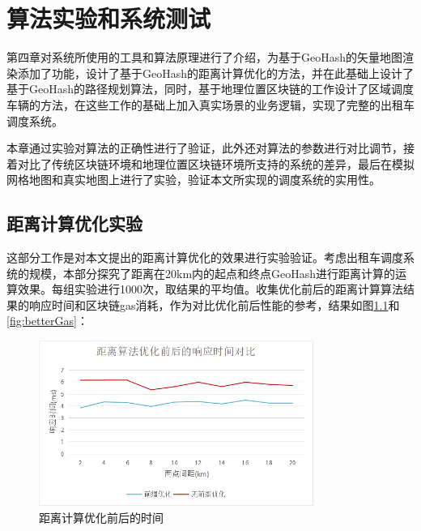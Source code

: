 \chapter{算法实验和系统测试}
第四章对系统所使用的工具和算法原理进行了介绍，为基于GeoHash的矢量地图渲染添加了功能，设计了基于GeoHash的距离计算优化的方法，并在此基础上设计了基于GeoHash的路径规划算法，同时，基于地理位置区块链的工作设计了区域调度车辆的方法，在这些工作的基础上加入真实场景的业务逻辑，实现了完整的出租车调度系统。

本章通过实验对算法的正确性进行了验证，此外还对算法的参数进行对比调节，接着对比了传统区块链环境和地理位置区块链环境所支持的系统的差异，最后在模拟网格地图和真实地图上进行了实验，验证本文所实现的调度系统的实用性。




\section{距离计算优化实验}
这部分工作是对本文提出的距离计算优化的效果进行实验验证。考虑出租车调度系统的规模，本部分探究了距离在20km内的起点和终点GeoHash进行距离计算的运算效果。每组实验进行1000次，取结果的平均值。收集优化前后的距离计算算法结果的响应时间和区块链gas消耗，作为对比优化前后性能的参考，结果如图\ref{fig:betterDistance}和\ref{fig:betterGas}：

\begin{figure}[h]
  \centering
  \includegraphics[height=0.3\textheight,width=0.8\textwidth]{figures/距离计算优化时间}
  \caption{距离计算优化前后的时间}\label{fig:betterDistance}
\end{figure}

